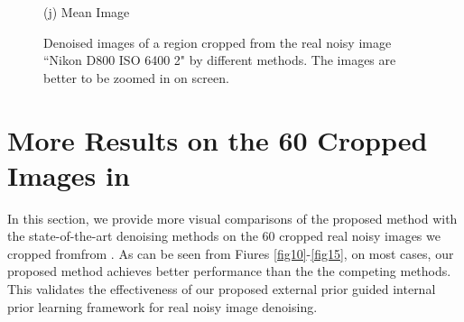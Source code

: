 \documentclass[10pt,onecolumn,letterpaper]{article}
\begin{document}
\begin{figure}[H]
{\begin{minipage}[t]{0.195\textwidth}
{\footnotesize (j) Mean Image \cite{crosschannel2016}}
\end{minipage}
}
\caption{Denoised images of a region cropped from the real noisy image ``Nikon D800 ISO 6400 2" \cite{crosschannel2016} by different methods. The images are better to be zoomed in on screen.}
\label{fig9}
\end{figure}

\section{More Results on the 60 Cropped Images in \cite{crosschannel2016}}
In this section, we provide more visual comparisons of the proposed method with the state-of-the-art denoising methods on the 60 cropped real noisy images we cropped fromfrom \cite{crosschannel2016}. As can be seen from Fiures \ref{fig10}-\ref{fig15}, on most cases, our proposed method achieves better performance than the the competing methods. This validates the effectiveness of our proposed external prior guided internal prior learning framework for real noisy image denoising.
\end{document}
